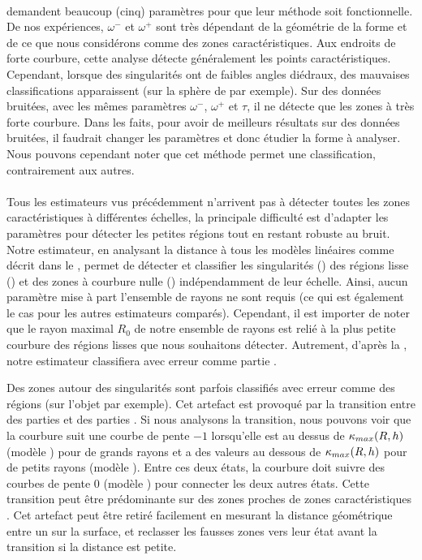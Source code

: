 \paragraph{}
%
 demandent beaucoup (cinq) paramètres pour que leur méthode soit fonctionnelle. De
nos expériences, $\omega^-$ et $\omega^+$ sont très dépendant de la géométrie de
la forme et de ce que nous considérons comme des zones caractéristiques. Aux
endroits de forte courbure, cette analyse détecte généralement les points
caractéristiques. Cependant, lorsque des singularités ont de faibles angles
diédraux, des mauvaises classifications apparaissent (sur la sphère de
\CubeSphere par exemple). Sur des données bruitées, avec les mêmes
paramètres $\omega^-$, $\omega^+$ et $\tau$, il ne détecte que les zones à très
forte courbure. Dans les faits, pour avoir de meilleurs résultats sur des
données bruitées, il faudrait changer les paramètres et donc étudier la forme à
analyser. Nous pouvons cependant noter que cet méthode permet une
classification, contrairement aux autres.
%
\paragraph{}
%
Tous les estimateurs vus précédemment n'arrivent pas à détecter toutes les zones
caractéristiques à différentes échelles, la principale difficulté est d'adapter
les paramètres pour détecter les petites régions tout en restant robuste au
bruit. Notre estimateur, en analysant la distance à tous les modèles linéaires
comme décrit dans le ,
permet de détecter et classifier les singularités (\featedge) des régions lisse
(\featsmooth) et des zones à courbure nulle (\featflat) indépendamment de leur
échelle. Ainsi, aucun paramètre mise à part l'ensemble de rayons ne sont requis
(ce qui est également le cas pour les autres estimateurs comparés). Cependant,
il est importer de noter que le rayon maximal $R_0$ de notre ensemble de rayons
est relié à la plus petite courbure des régions lisses que nous souhaitons
détecter. Autrement, d'après la , notre estimateur
classifiera avec erreur comme partie \featflat.


Des zones autour des singularités sont parfois classifiés avec erreur
comme des régions \featsmooth (sur l'objet \CubeSphere par exemple). Cet
artefact est provoqué par la transition entre des parties \featflat et des
parties \featedge. Si nous analysons la transition, nous pouvons voir que la
courbure suit une courbe de pente $-1$ lorsqu'elle est au dessus de
$\kappa_{max}(R,h)$ (modèle \featedge) pour de grands rayons et a des valeurs au
dessous de $\kappa_{max}(R,h)$ pour de petits rayons (modèle \featflat). Entre ces
deux états, la courbure doit suivre des courbes de pente $0$ (modèle
\featsmooth) pour connecter les deux autres états. Cette transition peut être
prédominante sur des zones proches de zones caractéristiques \featedge. Cet
artefact peut être retiré facilement en mesurant la distance géométrique entre
un \featedge sur la surface, et reclasser les fausses zones \featsmooth vers
leur état avant la transition si la distance est petite.


